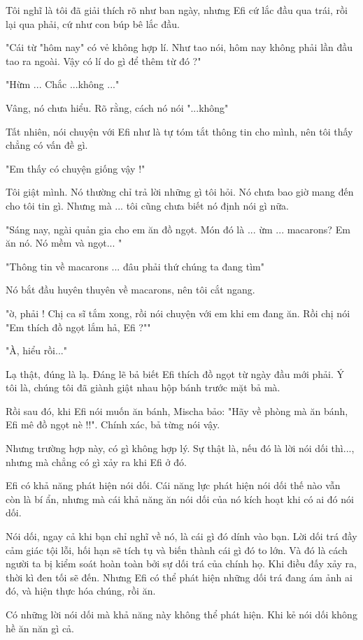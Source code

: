 Tôi nghĩ là tôi đã giải thích rõ như ban ngày, nhưng Efi cứ lắc đầu qua trái, rồi lại qua phải, cứ như con búp bê lắc đầu.

"Cái từ "hôm nay" có vẻ không hợp lí. Như tao nói, hôm nay không phải lần đầu tao ra ngoài. Vậy có lí do gì để thêm từ đó ?"

"Hừm ... Chắc ...không ..."

Vâng, nó chưa hiểu. Rõ rằng, cách nó nói "...không"

Tất nhiên, nói chuyện với Efi như là tự tóm tắt thông tin cho mình, nên tôi thấy chẳng có vấn đề gì.

"Em thấy có chuyện giống vậy !"

Tôi giật mình. Nó thường chỉ trả lời những gì tôi hỏi. Nó chưa bao giờ mang đến cho tôi tin gì. Nhưng mà ... tôi cũng chưa biết nó định nói gì nữa.

"Sáng nay, ngài quản gia cho em ăn đồ ngọt. Món đó là ... ừm ... macarons? Em ăn nó. Nó mềm và ngọt... "

"Thông tin về macarons ... đâu phải thứ chúng ta đang tìm"

Nó bắt đầu huyên thuyên về macarons, nên tôi cắt ngang.

"ờ, phải ! Chị ca sĩ tắm xong, rồi nói chuyện với em khi em đang ăn. Rồi chị nói "Em thích đồ ngọt lắm hả, Efi ?""

"À, hiểu rồi..."

Lạ thật, đúng là lạ. Đáng lẽ bả biết Efi thích đồ ngọt từ ngày đầu mới phải. Ý tôi là, chúng tôi đã giành giật nhau hộp bánh trước mặt bả mà.
 
Rồi sau đó, khi Efi nói muốn ăn bánh, Mischa bảo: "Hãy về phòng mà ăn bánh, Efi mê đồ ngọt nè !!". Chính xác, bả từng nói vậy.

Nhưng trường hợp này, có gì không hợp lý. Sự thật là, nếu đó là lời nói dối thì..., nhưng mà chẳng có gì xảy ra khi Efi ở đó.

Efi có khả năng phát hiện nói dối. Cái năng lực phát hiện nói dối thế nào vẫn còn là bí ẩn, nhưng mà cái khả năng ăn nói dối của nó kích hoạt khi có ai đó nói dối.

Nói dối, ngay cả khi bạn chỉ nghĩ về nó, là cái gì đó dính vào bạn. Lời dối trá đầy cảm giác tội lỗi, hối hạn sẽ tích tụ và biến thành cái gì đó to lớn. Và đó là cách người ta bị kiểm soát hoàn toàn bởi sự dối trá của chính họ. Khi điều đấy xảy ra, thời kì đen tối sẽ đến. Nhưng Efi có thể phát hiện những dối trá đang ám ảnh ai đó, và hiện thực hóa chúng, rồi ăn.

Có những lời nói dối mà khả năng này không thể phát hiện. Khi kẻ nói dối không hề ăn năn gì cả.

